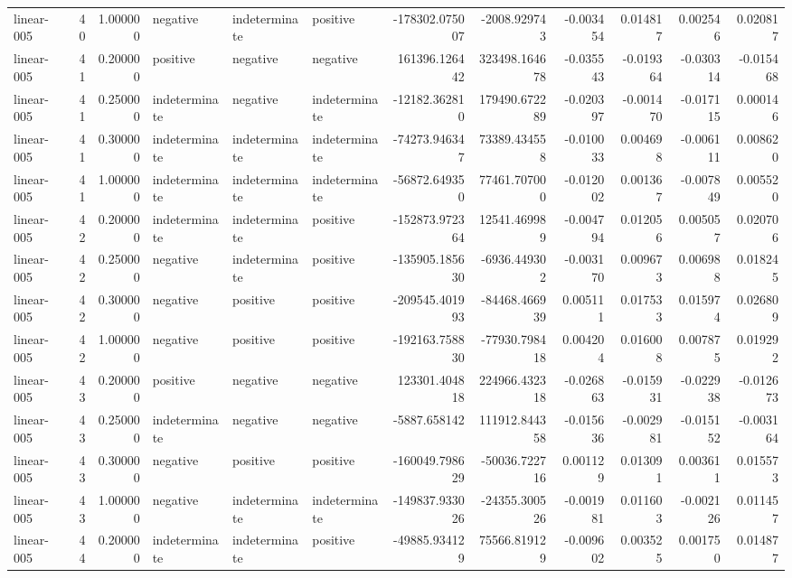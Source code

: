 \begin{tabular}{lrrlllrrrrrr}
linear-005 & 40 & 1.000000 & negative & indeterminate & positive & -178302.075007 & -2008.929743 & -0.003454 & 0.014817 & 0.002546 & 0.020817 \\
linear-005 & 41 & 0.200000 & positive & negative & negative & 161396.126442 & 323498.164678 & -0.035543 & -0.019364 & -0.030314 & -0.015468 \\
linear-005 & 41 & 0.250000 & indeterminate & negative & indeterminate & -12182.362810 & 179490.672289 & -0.020397 & -0.001470 & -0.017115 & 0.000146 \\
linear-005 & 41 & 0.300000 & indeterminate & indeterminate & indeterminate & -74273.946347 & 73389.434558 & -0.010033 & 0.004698 & -0.006111 & 0.008620 \\
linear-005 & 41 & 1.000000 & indeterminate & indeterminate & indeterminate & -56872.649350 & 77461.707000 & -0.012002 & 0.001367 & -0.007849 & 0.005520 \\
linear-005 & 42 & 0.200000 & indeterminate & indeterminate & positive & -152873.972364 & 12541.469989 & -0.004794 & 0.012056 & 0.005057 & 0.020706 \\
linear-005 & 42 & 0.250000 & negative & indeterminate & positive & -135905.185630 & -6936.449302 & -0.003170 & 0.009673 & 0.006988 & 0.018245 \\
linear-005 & 42 & 0.300000 & negative & positive & positive & -209545.401993 & -84468.466939 & 0.005111 & 0.017533 & 0.015974 & 0.026809 \\
linear-005 & 42 & 1.000000 & negative & positive & positive & -192163.758830 & -77930.798418 & 0.004204 & 0.016008 & 0.007875 & 0.019292 \\
linear-005 & 43 & 0.200000 & positive & negative & negative & 123301.404818 & 224966.432318 & -0.026863 & -0.015931 & -0.022938 & -0.012673 \\
linear-005 & 43 & 0.250000 & indeterminate & negative & negative & -5887.658142 & 111912.844358 & -0.015636 & -0.002981 & -0.015152 & -0.003164 \\
linear-005 & 43 & 0.300000 & negative & positive & positive & -160049.798629 & -50036.722716 & 0.001129 & 0.013091 & 0.003611 & 0.015573 \\
linear-005 & 43 & 1.000000 & negative & indeterminate & indeterminate & -149837.933026 & -24355.300526 & -0.001981 & 0.011603 & -0.002126 & 0.011457 \\
linear-005 & 44 & 0.200000 & indeterminate & indeterminate & positive & -49885.934129 & 75566.819129 & -0.009602 & 0.003525 & 0.001750 & 0.014877 \\

\end{tabular}
